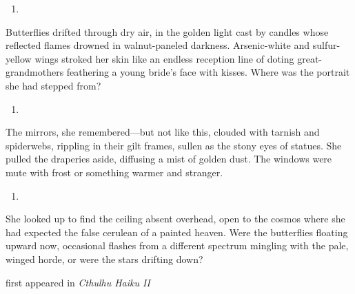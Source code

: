 \begin{enumerate}
\def\labelenumi{\Roman{enumi}.}
\item
\end{enumerate}

Butterflies drifted through dry air, in the golden light cast by candles
whose reflected flames drowned in walnut-paneled darkness. Arsenic-white
and sulfur-yellow wings stroked her skin like an endless reception line
of doting great-grandmothers feathering a young bride's face with
kisses. Where was the portrait she had stepped from?

\begin{enumerate}
\def\labelenumi{\Roman{enumi}.}
\setcounter{enumi}{1}
\item
\end{enumerate}

The mirrors, she remembered---but not like this, clouded with tarnish
and spiderwebs, rippling in their gilt frames, sullen as the stony eyes
of statues. She pulled the draperies aside, diffusing a mist of golden
dust. The windows were mute with frost or something warmer and stranger.

\begin{enumerate}
\def\labelenumi{\Roman{enumi}.}
\setcounter{enumi}{2}
\item
\end{enumerate}

She looked up to find the ceiling absent overhead, open to the cosmos
where she had expected the false cerulean of a painted heaven. Were the
butterflies floating upward now, occasional flashes from a different
spectrum mingling with the pale, winged horde, or were the stars
drifting down?

first appeared in \emph{Cthulhu Haiku II}

